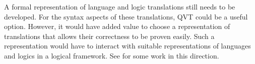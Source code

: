 \documentclass[10pt, a4paper]{isov2}
\begin{document}
A formal representation of language and logic translations still needs
to be developed. For the syntax aspects of these translations, QVT
could be a useful option. However, it would have added value to choose
a representation of translations that allows  their correctness
to be proven easily. Such a representation would have to interact
with suitable representations of languages and logics in a 
logical framework. See \cite{CodescuEtAl2011d} for some work
in this direction.


\cleardoublepage
{}\label{a:ext-graph}
\end{document}
